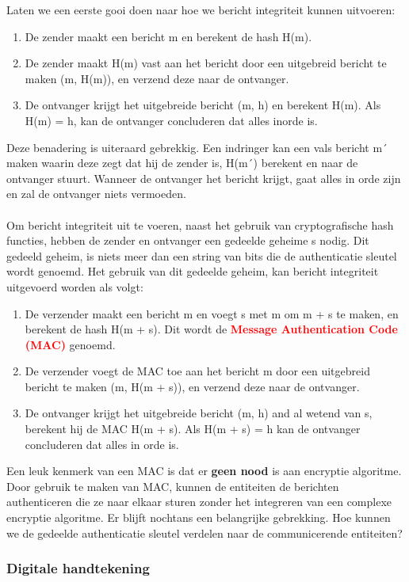Laten we een eerste gooi doen naar hoe we bericht integriteit kunnen uitvoeren:
\begin{enumerate}
    \item De zender maakt een bericht m en berekent de hash H(m).
     \item De zender maakt H(m) vast aan het bericht door een uitgebreid bericht te maken (m, H(m)), en verzend deze naar de ontvanger.
 \item De ontvanger krijgt het uitgebreide bericht (m, h) en berekent H(m). Als H(m) = h, kan de ontvanger concluderen dat alles inorde is.
\end{enumerate}
Deze benadering is uiteraard gebrekkig. Een indringer kan een vals bericht m´ maken waarin deze zegt dat hij de zender is, H(m´) berekent en naar de ontvanger stuurt. Wanneer de ontvanger het bericht krijgt, gaat alles in orde zijn en zal de ontvanger niets vermoeden.
\\\\
Om bericht integriteit uit te voeren, naast het gebruik van cryptografische hash functies, hebben de zender en ontvanger een gedeelde geheime s nodig. Dit gedeeld geheim, is niets meer dan een string van bits die de authenticatie sleutel wordt genoemd. Het gebruik van dit gedeelde geheim, kan bericht integriteit uitgevoerd worden als volgt:
\begin{enumerate}
    \item De verzender maakt een bericht m en voegt s met m om m + s te maken, en berekent de hash H(m + s). Dit wordt de \textcolor{red}{\textbf{Message Authentication Code (MAC)}} genoemd.
    \item De verzender voegt de MAC toe aan het bericht m door een uitgebreid bericht te maken (m, H(m + s)), en verzend deze naar de ontvanger.
    \item De ontvanger krijgt het uitgebreide bericht (m, h) and al wetend van s, berekent hij de MAC H(m + s). Als H(m + s) = h kan de ontvanger concluderen dat alles in orde is.
\end{enumerate}
Een leuk kenmerk van een MAC is dat er \textbf{geen nood} is aan encryptie algoritme. Door gebruik te maken van MAC, kunnen de entiteiten de berichten authenticeren die ze naar elkaar sturen zonder het integreren van een complexe encryptie algoritme.
Er blijft nochtans een belangrijke gebrekking. Hoe kunnen we de gedeelde authenticatie sleutel verdelen naar de communicerende entiteiten?

\clearpage

\subsubsection{Digitale handtekening}

